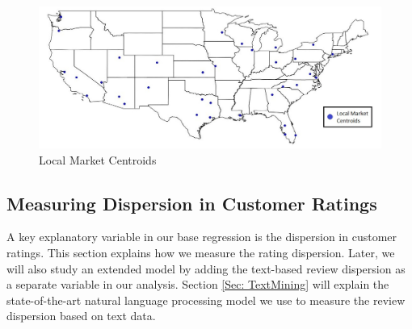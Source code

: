 \documentclass[msom,blindrev]{informs3}
\begin{document}
	
	
	
	
	
	
	
	\begin{figure}
		\centering
		\includegraphics[width=1\linewidth]{markets.jpg}
		\caption{Local Market Centroids}
		\label{fig: markets}
	\end{figure}
	
	\subsection{Measuring Dispersion in Customer Ratings} \label{Subsec: Measure Dispersion}
	
	A key explanatory variable in our base regression is the dispersion in customer ratings. This section explains how we measure the rating dispersion. Later, we will also study an extended model by adding the text-based review dispersion as a separate variable in our analysis.  Section \ref{Sec: TextMining} will explain the state-of-the-art natural language processing model we use to measure the review dispersion based on text data.
	
	
\end{document}
